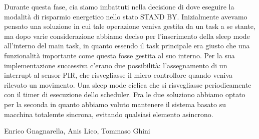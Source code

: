 \documentclass[a4paper]{article}
\begin{document}
Durante questa fase, cia siamo imbattuti nella decisione di dove eseguire la modalità di risparmio energetico nello stato STAND BY. Inizialmente avevamo pensato una soluzione in cui tale operazione veniva gestita da un task a se stante, ma dopo varie considerazione abbiamo deciso per l'inserimento della sleep mode all'interno del main task, in quanto essendo il task principale era giusto che una funzionalità importante come questa fosse gestita al suo interno. 
Per la sua implementazione successiva c'erano due possibilità:  l'assegnamento di un interrupt al sensor PIR, che risvegliasse il micro controllore quando veniva rilevato un movimento. Una sleep mode ciclica che si risvegliasse periodicamente con il timer di esecuzione dello scheduler.
Fra le due soluziono abbiamo optato per la seconda in quanto abbiamo voluto mantenere il sistema basato su macchina totalemte sincrona, evitando qualsiasi elemento asincrono.



\newpage
\null
\vfill
Enrico Gnagnarella, Anis Lico, Tommaso Ghini
\clearpage
\end{document}
